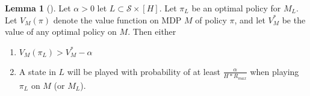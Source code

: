 \documentclass[12pt, letterpaper]{article}
\theoremstyle{definition}
\newtheorem*{lemma}{Lemma}
\theoremstyle{remark}
\begin{document}
\begin{lemma}[]
    Let \(\alpha > 0\) let \(L \subset \mathcal{S} \times [H]\). Let \(\pi_L\) be an optimal policy for \(M_L\). Let \(V_{M}(\pi)\) denote the value function on MDP \(M\) of policy \(\pi\), and let \(V^*_{M}\) be the value of any optimal policy on \(M\). Then either

    \begin{enumerate}
        \item \(V_{M} (\pi_L) > V^*_{M} - \alpha\)
        \item A state in \(L\) will be played with probability of at least \(\frac{\alpha}{H*R_{max}}\) when playing \(\pi_L\) on \(M\) (or \(M_L\)).
    \end{enumerate}
    
\end{lemma}
\end{document}
